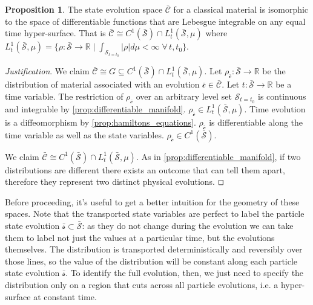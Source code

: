 \documentclass[smallextended]{svjour3}
\numberwithin{equation}{section}
\newenvironment{justification}{\emph{Justification}.}{\hfill\(\qed\)}
\theoremstyle{definition}
\newtheorem{prop}[equation]{Proposition}
\newenvironment{justification}{\emph{Justification}.}{\qed}
\begin{document}
\begin{prop}\label{prop:state_evolution_space}
	The state evolution space $\bar{\mathcal{C}}$ for a classical material is isomorphic to the space of differentiable functions that are Lebesgue integrable on any equal time hyper-surface. That is $\bar{\mathcal{C}} \cong  C^1(\bar{\mathcal{S}})\cap L^1_t(\bar{\mathcal{S}}, \mu)$ where $L^1_t(\bar{\mathcal{S}}, \mu)=\{{\rho: \bar{\mathcal{S}} \rightarrow \mathbb{R}} \; | \; {\int_{\mathcal{S}_{t=t_0}} |\rho| d\mu < \infty} \; \forall \, t, t_0 \}$.
\end{prop}

\begin{justification}
	We claim $\bar{\mathcal{C}} \cong  G \subseteq C^1(\bar{\mathcal{S}})\cap L^1_t(\bar{\mathcal{S}}, \mu)$. Let $\rho_{\bar{\mathcal{c}}} : \bar{\mathcal{S}} \rightarrow \mathbb{R}$ be the distribution of material associated with an evolution $\bar{\mathcal{c}} \in \bar{\mathcal{C}}$. Let $t : \bar{\mathcal{S}} \rightarrow \mathbb{R}$ be a time variable. 
	The restriction of $\rho_{\bar{\mathcal{c}}}$ over an arbitrary level set $\mathcal{S}_{t=t_0}$ is continuous and integrable by \ref{prop:differentiable_manifold}. $\rho_{\bar{\mathcal{c}}} \in L^1_t(\bar{\mathcal{S}}, \mu)$. Time evolution is a diffeomorphism by \ref{prop:hamiltons_equations}. $\rho_{\bar{\mathcal{c}}}$ is differentiable along the time variable as well as the state variables. $\rho_{\bar{\mathcal{c}}} \in C^1(\bar{\mathcal{S}})$.
	
	We claim $\bar{\mathcal{C}} \cong  C^1(\bar{\mathcal{S}})\cap L^1_t(\bar{\mathcal{S}}, \mu)$. As in \ref{prop:differentiable_manifold}, if two distributions are different there exists an outcome that can tell them apart, therefore they represent two distinct physical evolutions.
\end{justification}

Before proceeding, it's useful to get a better intuition for the geometry of these spaces. Note that the transported state variables are perfect to label the particle state evolution $\bar{\mathcal{s}} \subset \bar{\mathcal{S}}$: as they do not change during the evolution we can take them to label not just the values at a particular time, but the evolutions themselves. The distribution is transported deterministically and reversibly over those lines, so the value of the distribution will be constant along each particle state evolution $\bar{\mathcal{s}}$. To identify the full evolution, then, we just need to specify the distribution only on a region that cuts across all particle evolutions, i.e. a hyper-surface at constant time.
\end{document}
